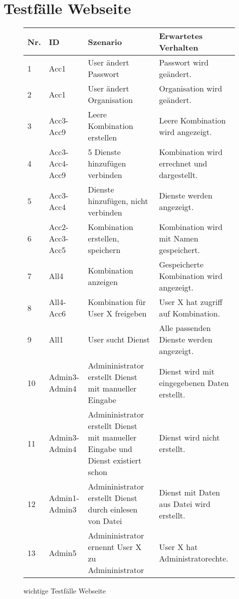 \section{Testfälle Webseite}
\begin{figure}[!h]
	\begin{center}
		\begin{tabularx}{\textwidth}{ p{} | p{} | p{} | X }
			\textbf{Nr.} & \textbf{ID} & \textbf{Szenario} & \textbf{Erwartetes Verhalten} \\ \hline
			1 & Acc1 &User ändert Passwort & Passwort wird geändert.\\ \hline
			2 & Acc1 &User ändert Organisation &Organisation wird geändert.\\ \hline
			3 & Acc3-Acc9 &Leere Kombination erstellen &Leere Kombination wird angezeigt.\\ \hline
			4 & Acc3-Acc4-Acc9 &5 Dienste hinzufügen verbinden  &Kombination wird errechnet und dargestellt. \\ \hline
			5 & Acc3-Acc4 &Dienste hinzufügen, nicht verbinden &Dienste werden angezeigt.\\ \hline
			6 & Acc2-Acc3-Acc5 &Kombination erstellen,  speichern &Kombination wird mit Namen gespeichert.\\ \hline
			7 & All4 &Kombination anzeigen &Gespeicherte Kombination wird angezeigt. \\ \hline
			8 & All4-Acc6 &Kombination für User X freigeben &User X hat zugriff auf Kombination.\\ \hline
			9 & All1 &User sucht Dienst &Alle passenden Dienste werden angezeigt.\\ \hline
			10 & Admin3-Admin4 &Admininistrator erstellt Dienst mit manueller Eingabe &Dienst wird mit eingegebenen Daten erstellt.\\ \hline
      11 & Admin3-Admin4 &Admininistrator erstellt Dienst mit manueller Eingabe und Dienst existiert schon &Dienst wird nicht erstellt.\\ \hline
			12 & Admin1-Admin3 &Admininistrator erstellt Dienst durch einlesen von Datei &Dienst mit Daten aus Datei wird erstellt. \\ \hline
			13 & Admin5 &Admininistrator ernennt User X zu Admininistrator &User X hat Administratorechte.\\ \hline
			\end{tabularx}
	\end{center}
	\caption{wichtige Testfälle Webseite}
	\label{fig:testfaelle-tabelle}
\end{figure}
\newpage

